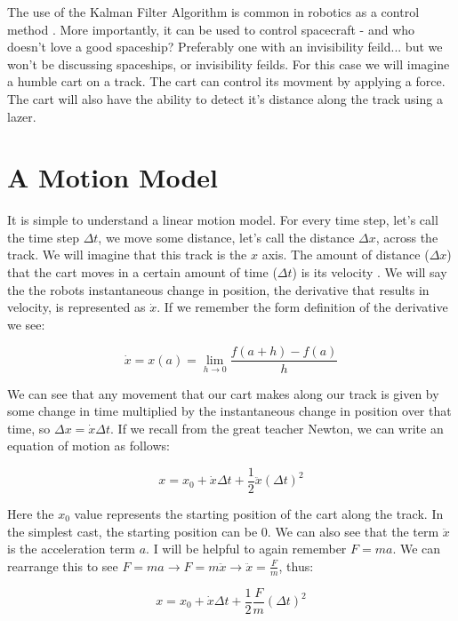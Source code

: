 \documentclass[11pt]{article}
\begin{document}
\maketitle

The use of the Kalman Filter Algorithm is common in robotics as a control
method \cite{probrobtics}. More importantly, it can be used to control spacecraft - and
who doesn't love a good spaceship? Preferably one with an invisibility feild... but
we won't be discussing spaceships, or invisibility feilds. For this case we will
imagine a humble cart on a track. The cart can control its movment by applying a force.
The cart will also have the ability to detect it's distance along the track using
a lazer.

\section{A Motion Model}

It is simple to understand a linear motion model. For every time step, let's call
the time step $\Delta t$, we move some distance, let's call the distance $\Delta x$,
across the track. We will imagine that this track is the $x$ axis. The amount of
distance ($\Delta x$) that the cart moves in a certain amount of time ($\Delta t$)
is its velocity \cite{euclid}. We will say the the robots instantaneous change in position, the
derivative that results in velocity, is represented as $\dot{x}$. If we remember the
form definition of the derivative \cite{calculus} we see:

\[
\dot{x} = x(a) = \lim_{h\to0} \frac{f(a + h) - f(a) }{h}
\]

We can see that any movement that our cart makes along our track is given by some
change in time multiplied by the instantaneous change in position over that time,
so $\Delta x =  \dot{x} \Delta t$. If we recall from the great teacher Newton, we can
write an equation of motion \cite{Principia} as follows:

\[
x = x_0 + \dot{x} \Delta t + \frac{1}{2} \ddot{x} (\Delta t)^2
\]

Here the $x_0$ value represents the starting position of the cart along the track.
In the simplest cast, the starting position can be $0$. We can also see that the
term $\ddot{x}$ is the acceleration term $a$. I will be helpful to again remember
$F= ma$. We can rearrange this to see $F = ma \rightarrow F = m \ddot{x} \rightarrow \ddot{x} = \frac{F}{m}$,
thus:

\[
x = x_0 + \dot{x} \Delta t + \frac{1}{2} \frac{F}{m} (\Delta t)^2
\]
\end{document}
